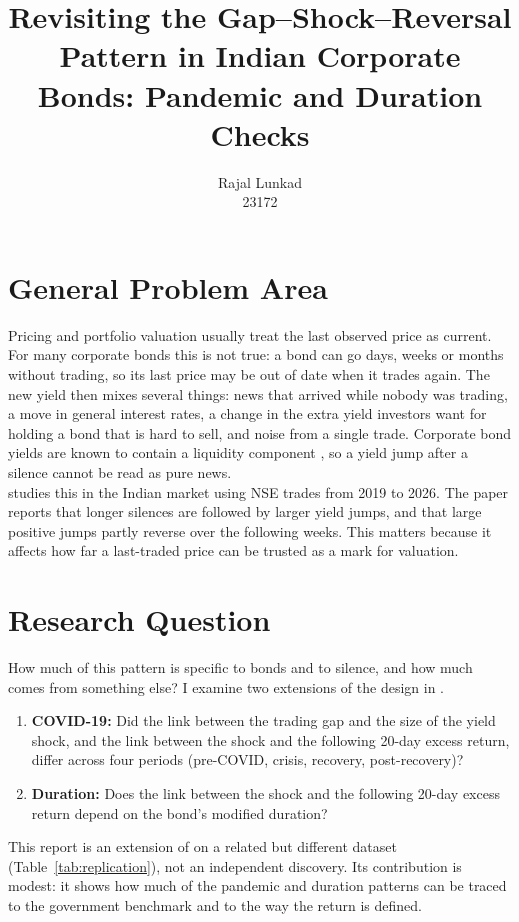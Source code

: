 \documentclass[a4paper,11pt]{article}
\title{Revisiting the Gap--Shock--Reversal Pattern in Indian Corporate Bonds: Pandemic and Duration Checks}
\author{Rajal Lunkad\\23172}
\date{}
\begin{document}
\maketitle
\thispagestyle{empty}

\tableofcontents
\newpage

\section{General Problem Area}
Pricing and portfolio valuation usually treat the last observed price as current. For many corporate bonds this is not true: a bond can go days, weeks or months without trading, so its last price may be out of date when it trades again. The new yield then mixes several things: news that arrived while nobody was trading, a move in general interest rates, a change in the extra yield investors want for holding a bond that is hard to sell, and noise from a single trade. Corporate bond yields are known to contain a liquidity component \cite{chen2007corporate,bao2011illiquidity}, so a yield jump after a silence cannot be read as pure news.\\ \cite{kumar2026delayed} studies this in the Indian market using NSE trades from 2019 to 2026. The paper reports that longer silences are followed by larger yield jumps, and that large positive jumps partly reverse over the following weeks. This matters because it affects how far a last-traded price can be trusted as a mark for valuation.

\section{Research Question}
How much of this pattern is specific to bonds and to silence, and how much comes from something else? I examine two extensions of the design in \cite{kumar2026delayed}.
\begin{enumerate}
	\item \textbf{COVID-19:} Did the link between the trading gap and the size of the yield shock, and the link between the shock and the following 20-day excess return, differ across four periods (pre-COVID, crisis, recovery, post-recovery)?
	\item \textbf{Duration:} Does the link between the shock and the following 20-day excess return depend on the bond's modified duration?
\end{enumerate}
This report is an extension of \cite{kumar2026delayed} on a related but different dataset (Table~\ref{tab:replication}), not an independent discovery. Its contribution is modest: it shows how much of the pandemic and duration patterns can be traced to the government benchmark and to the way the return is defined.
\end{document}
